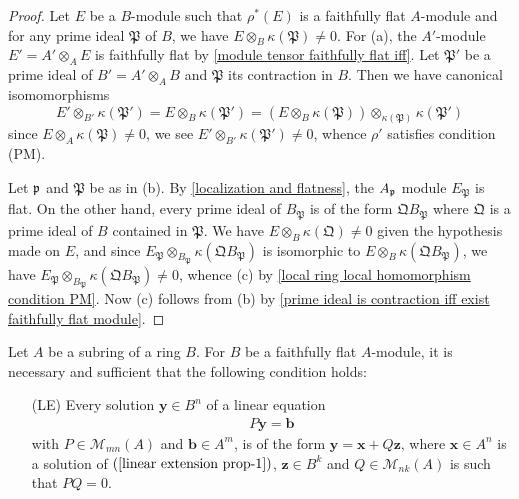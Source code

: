\begin{proof}
Let $E$ be a $B$-module such that $\rho^*(E)$ is a faithfully flat $A$-module and for any prime ideal $\mathfrak{P}$ of $B$, we have $E\otimes_B\kappa(\mathfrak{P})\neq 0$. For (a), the $A'$-module $E'=A'\otimes_AE$ is faithfully flat by \cref{module tensor faithfully flat iff}. Let $\mathfrak{P}'$ be a prime ideal of $B'=A'\otimes_AB$ and $\mathfrak{P}$ its contraction in $B$. Then we have canonical isomomorphisms
\[E'\otimes_{B'}\kappa(\mathfrak{P}')=E\otimes_B\kappa(\mathfrak{P}')=(E\otimes_B\kappa(\mathfrak{P}))\otimes_{\kappa(\mathfrak{P})}\kappa(\mathfrak{P}')\]
since $E\otimes_A\kappa(\mathfrak{P})\neq 0$, we see $E'\otimes_{B'}\kappa(\mathfrak{P}')\neq 0$, whence $\rho'$ satisfies condition (PM).\par 
Let $\mathfrak{p}$ and $\mathfrak{P}$ be as in (b). By \cref{localization and flatness}, the $A_{\mathfrak{p}}$ module $E_{\mathfrak{P}}$ is flat. On the other hand, every prime ideal of $B_{\mathfrak{P}}$ is of the form $\mathfrak{Q}B_{\mathfrak{P}}$ where $\mathfrak{Q}$ is a prime ideal of $B$ contained in $\mathfrak{P}$. We have $E\otimes_B\kappa(\mathfrak{Q})\neq 0$ given the hypothesis made on $E$, and since $E_{\mathfrak{P}}\otimes_{B_{\mathfrak{P}}}\kappa(\mathfrak{Q}B_{\mathfrak{P}})$ is isomorphic to $E\otimes_B\kappa(\mathfrak{Q}B_{\mathfrak{P}})$, we have $E_{\mathfrak{P}}\otimes_{B_{\mathfrak{P}}}\kappa(\mathfrak{Q}B_{\mathfrak{P}})\neq 0$, whence (c) by \cref{local ring local homomorphism condition PM}. Now (c) follows from (b) by \cref{prime ideal is contraction iff exist faithfully flat module}.
\end{proof}
\begin{proposition}\label{module faithfully flat iff linear relation}
Let $A$ be a subring of a ring $B$. For $B$ be a faithfully flat $A$-module, it is necessary and sufficient that the following condition holds:
\begin{enumerate}
\item[(LE)] Every solution $\bm{y}\in B^n$ of a linear equation
\begin{align}\label{linear extension prop-1}
P\bm{y}=\bm{b}
\end{align}
with $P\in\mathcal{M}_{mn}(A)$ and $\bm{b}\in A^m$, is of the form $\bm{y}=\bm{x}+Q\bm{z}$, where $\bm{x}\in A^n$ is a solution of $(\ref{linear extension prop-1})$, $\bm{z}\in B^k$ and $Q\in\mathcal{M}_{nk}(A)$ is such that $PQ=0$.
\end{enumerate}
\end{proposition}
